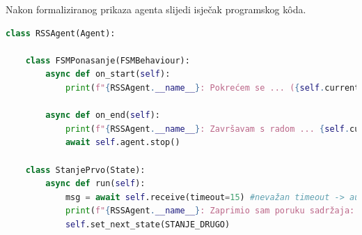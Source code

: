 \documentclass[]{foi} %
\begin{document}
Nakon formaliziranog prikaza agenta slijedi isječak programskog kôda.
\begin{lstlisting}[language=Python, caption={Programski kôd za RSSAgent agenta}]
class RSSAgent(Agent):

    class FSMPonasanje(FSMBehaviour):
        async def on_start(self):
            print(f"{RSSAgent.__name__}: Pokrećem se ... ({self.current_state})")

        async def on_end(self):
            print(f"{RSSAgent.__name__}: Završavam s radom ... {self.current_state}")
            await self.agent.stop()

    class StanjePrvo(State):
        async def run(self):
            msg = await self.receive(timeout=15) #nevažan timeout -> automatski se poruka prima
            print(f"{RSSAgent.__name__}: Zaprimio sam poruku sadržaja: \"{msg.body}\"")
            self.set_next_state(STANJE_DRUGO)


\end{lstlisting}
\end{document}
